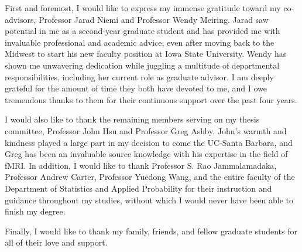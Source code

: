   \approvalpage
  \copyrightpage

  \begin{acknowledgements}

  First and foremost, I would like to express my immense gratitude toward my co-advisors, Professor Jarad Niemi and Professor Wendy Meiring. Jarad saw potential in me as a second-year graduate student and has provided me with invaluable professional and academic advice, even after moving back to the Midwest to start his new faculty position at Iowa State University. Wendy has shown me unwavering dedication while juggling a multitude of departmental responsibilities, including her current role as graduate advisor. I am deeply grateful for the amount of time they both have devoted to me, and I owe tremendous thanks to them for their continuous support over the past four years.

  I would also like to thank the remaining members serving on my thesis committee, Professor John Hsu and Professor Greg Ashby. John's warmth and kindness played a large part in my decision to come the UC-Santa Barbara, and Greg has been an invaluable source knowledge with his expertise in the field of fMRI. In addition, I would like to thank Professor S. Rao Jammalamadaka, Professor Andrew Carter, Professor Yuedong Wang, and the entire faculty of the Department of Statistics and Applied Probability for their instruction and guidance throughout my studies, without which I would never have been able to finish my degree.

  Finally, I would like to thank my family, friends, and fellow graduate students for all of their love and support.

  \end{acknowledgements}
\ssp

